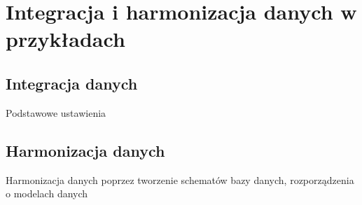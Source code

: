 \chapter{Integracja i harmonizacja danych w przykładach}
	\section{Integracja danych}
	Podstawowe ustawienia
	\section{Harmonizacja danych}
Harmonizacja danych poprzez tworzenie schematów bazy danych, rozporządzenia o modelach danych
